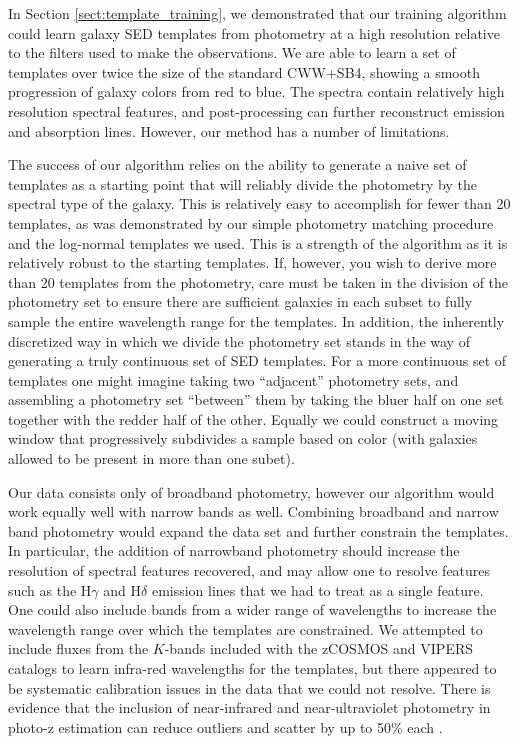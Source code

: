 
\label{sect:discussion}

In Section \ref{sect:template_training}, we demonstrated that our training algorithm could learn galaxy SED templates from photometry at a high resolution relative to the filters used to make the observations.
We are able to learn a set of templates over twice the size of the standard CWW+SB4, showing a smooth progression of galaxy colors from red to blue.
The spectra contain relatively high resolution spectral features, and post-processing can further reconstruct emission and absorption lines.
However, our method has a number of limitations.

The success of our algorithm relies on the ability to generate a naive set of templates as a starting point that will reliably divide the photometry by the spectral type of the galaxy. 
This is relatively easy to accomplish for fewer than 20 templates, as was demonstrated by our simple photometry matching procedure and the log-normal templates we used.
This is a strength of the algorithm as it is relatively robust to the starting templates. If, however, you wish to derive more than 20 templates from the photometry, care must be taken in the division of the photometry set to ensure there are sufficient galaxies in each subset to fully sample the entire wavelength range for the templates.
In addition, the inherently discretized way in which we divide the photometry set stands in the way of generating a truly continuous set of SED templates.
For a more continuous set of templates one might imagine taking two ``adjacent'' photometry sets, and assembling a photometry set ``between'' them by taking the bluer half on one set together with the redder half of the other. 
Equally we could construct a moving window that progressively subdivides a sample based on color (with galaxies allowed to be present in more than one subet).

Our data consists only of broadband photometry, however our algorithm would work equally well with narrow bands as well.
Combining broadband and narrow band photometry would expand the data set and further constrain the templates.
In particular, the addition of narrowband photometry should increase the resolution of spectral features recovered, and may allow one to resolve features such as the H$\gamma$ and H$\delta$ emission lines that we had to treat as a single feature.
One could also include bands from a wider range of wavelengths to increase the wavelength range over which the templates are constrained.
We attempted to include fluxes from the $K$-bands included with the zCOSMOS and VIPERS catalogs to learn  infra-red wavelengths for the templates, but there appeared to be systematic calibration issues in the data that we could not resolve.
There is evidence that the inclusion of near-infrared and near-ultraviolet photometry in photo-z estimation can reduce outliers and scatter by up to 50\% each \citep{Graham2020}.

